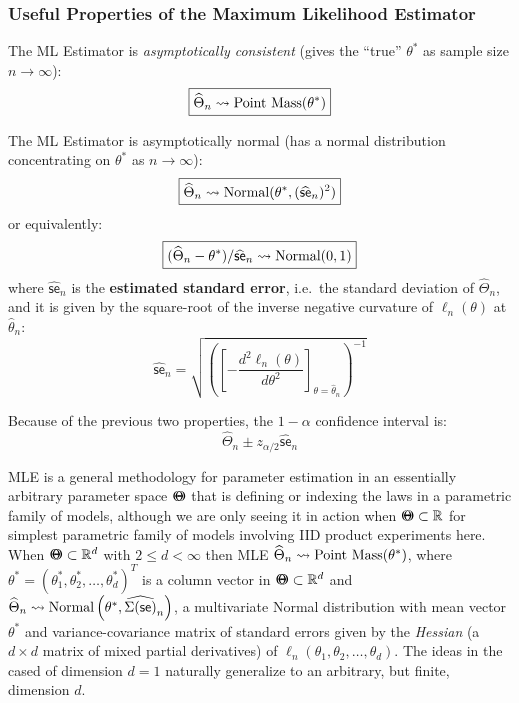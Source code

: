 \subsubsection*{Useful Properties of the Maximum Likelihood Estimator}
\be
\item The ML Estimator is {\em asymptotically consistent} (gives the ``true'' $\theta^*$ as sample size $n \to \infty$):
\[
\boxed{\widehat{\Theta}_n \rightsquigarrow \mbox{{\rm Point~Mass}}(\theta^*)}
\]
\item The ML Estimator is asymptotically normal (has a normal distribution concentrating on $\theta^*$ as $n \to \infty$):
\[
\boxed{\widehat{\Theta}_n \rightsquigarrow \mbox{{\rm Normal}}(\theta^*,(\widehat{\mathsf{se}}_n)^2)}
\]
or equivalently:
\[
\boxed{(\widehat{\Theta}_n - \theta^*) / \widehat{\mathsf{se}}_n \rightsquigarrow \mbox{{\rm Normal}}(0,1)}
\]
where $\widehat{\mathsf{se}}_n$ is the {\bf estimated standard error}, i.e.~the standard deviation of $\widehat{\Theta}_n$, and it is given by the square-root of the inverse negative curvature of $\ell_n(\theta)$ at $\widehat{\theta}_n$:
\[
\boxed{
\widehat{\mathsf{se}}_n = \sqrt{\left( \left[ -\frac{d^2 \ell_n(\theta)}{d \theta^2}\right]_{\theta=\widehat{\theta}_n}\right)^{-1}}
}
\]
\item Because of the previous two properties, the $1-\alpha$ confidence interval is:
\[
\boxed{
\widehat{\Theta}_n \pm z_{\alpha/2} \widehat{\mathsf{se}}_n 
}
\]
\ee

MLE is a general methodology for parameter estimation in an essentially arbitrary parameter space ${\Theta}\mspace{-11 mu}{\Theta}$ that is defining or indexing the laws in a parametric family of models, although we are only seeing it in action when ${\Theta}\mspace{-11 mu}{\Theta} \subset \mathbb{R}$ for simplest parametric family of models involving IID product experiments here.  
When ${\Theta}\mspace{-11 mu}{\Theta} \subset \mathbb{R}^d$ with $2 \leq d < \infty$ then MLE $\widehat{\Theta}_n \rightsquigarrow \mbox{{\rm Point~Mass}}(\theta^*)$, where $\theta^*=(\theta^*_1,\theta^*_2,\ldots,\theta^*_d)^{T}$ is a column vector in ${\Theta}\mspace{-11 mu}{\Theta} \subset \mathbb{R}^d$ 
and $\widehat{\Theta}_n \rightsquigarrow \mbox{{\rm Normal}}\left(\theta^*,\widehat{\Sigma(\mathsf{se})}_n\right)$, a multivariate Normal distribution with mean vector $\theta^*$ and variance-covariance matrix of standard errors given by the {\em Hessian} (a $d \times d$ matrix of mixed partial derivatives) of $\ell_n(\theta_1,\theta_2,\ldots,\theta_d)$.  The ideas in the cased of dimension $d=1$ naturally generalize to an arbitrary, but finite, dimension $d$.
 
